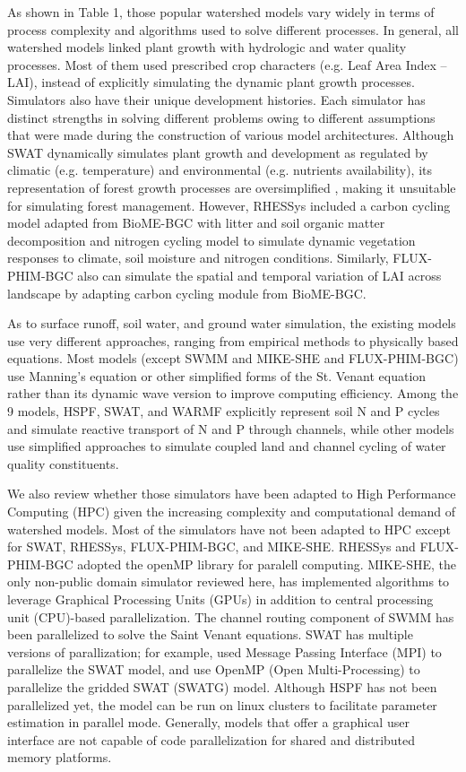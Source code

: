 \documentclass[preprint,review, 12pt]{elsarticle}
\begin{document}
As shown in Table 1, those popular watershed models vary widely in terms of process complexity and algorithms used to solve different processes. In general, all watershed models linked plant growth with hydrologic and water quality processes. Most of them used prescribed crop characters (e.g. Leaf Area Index -- LAI), instead of explicitly simulating the dynamic plant growth processes. Simulators also have their unique development histories. Each simulator has distinct strengths in solving different problems owing to different assumptions that were made during the construction of various model architectures. Although SWAT dynamically simulates plant growth and development as regulated by climatic (e.g. temperature) and environmental (e.g. nutrients availability), its representation of forest growth processes are oversimplified \citep{Yang2016}, making it unsuitable for simulating forest management. However, RHESSys \citep{Tague2004d} included a carbon cycling model adapted from BioME-BGC \citep{thornton1998regional} with litter and soil organic matter decomposition and nitrogen cycling model \citep{parton1996generalized} to simulate dynamic vegetation responses to climate, soil moisture and nitrogen conditions. Similarly, FLUX-PHIM-BGC \citep{Shi2018} also can simulate the spatial and temporal variation of LAI across landscape by adapting carbon cycling module from BioME-BGC.

As to surface runoff, soil water, and ground water simulation, the existing models use very different approaches, ranging from empirical methods to physically based equations. Most models (except SWMM and MIKE-SHE and FLUX-PHIM-BGC) use Manning’s equation or other simplified forms of the St. Venant equation rather than its dynamic wave version to improve computing efficiency. Among the 9 models, HSPF, SWAT, and WARMF explicitly represent soil N and P cycles and simulate reactive transport of N and P through channels, while other models use simplified approaches to simulate coupled land and channel cycling of water quality constituents. 

We also review whether those simulators have been adapted to High Performance Computing (HPC) given the increasing complexity and computational demand of watershed models. Most of the simulators have not been adapted to HPC except for SWAT, RHESSys, FLUX-PHIM-BGC, and MIKE-SHE. RHESSys and FLUX-PHIM-BGC adopted the openMP library for paralell computing. MIKE-SHE, the only non-public domain simulator reviewed here, has implemented algorithms to leverage Graphical Processing Units (GPUs) in addition to central processing unit (CPU)-based parallelization. The channel routing component of SWMM has been parallelized to solve the Saint Venant equations. SWAT has multiple versions of parallization; for example, \cite{Wu2013} used Message Passing Interface (MPI) to parallelize the SWAT model, and  \cite{Zhang2017} use OpenMP (Open Multi-Processing) to parallelize the gridded SWAT (SWATG) model.    Although HSPF has not been parallelized yet, the model can be run on linux clusters to facilitate parameter estimation in parallel mode. Generally, models that offer a graphical user interface are not capable of code parallelization for shared and distributed memory platforms. 
\end{document}
